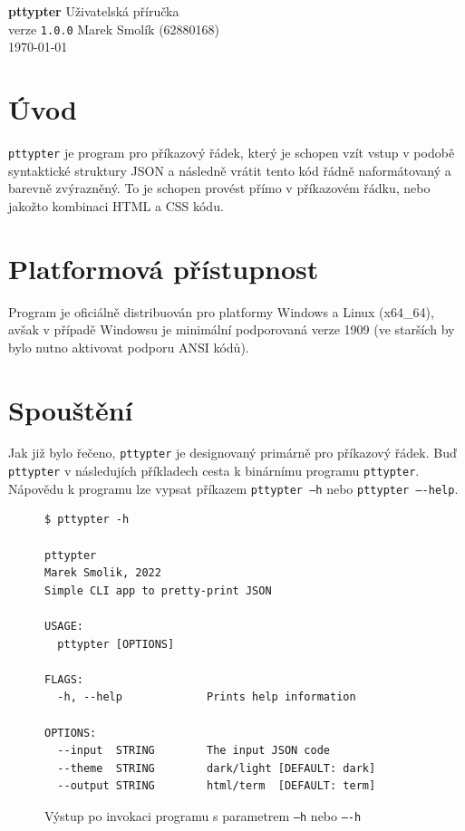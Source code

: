 \documentclass[11pt, letterpaper]{article}
\begin{document}
 
\begin{center}
\vfill
{\Huge \textbf{pttypter}}
\vfill
{\huge Uživatelská příručka} \\
{\large verze \texttt{1.0.0}}
\vfill
{\Large Marek Smolík (62880168)} \\
\today
\vfill
\end{center}

\newpage

\section{Úvod}
\texttt{pttypter} je program pro příkazový řádek, který je schopen vzít vstup v podobě syntaktické struktury JSON a následně vrátit tento kód řádně naformátovaný a barevně zvýrazněný. To je schopen provést přímo v příkazovém řádku, nebo jakožto kombinaci HTML a CSS kódu.

\section{Platformová přístupnost}
Program je oficiálně distribuován pro platformy Windows a Linux (x64\_64), avšak v případě Windowsu je minimální podporovaná verze 1909 (ve starších by bylo nutno aktivovat podporu ANSI kódů).

\section{Spouštění}
Jak již bylo řečeno, \texttt{pttypter} je designovaný primárně pro příkazový řádek. Buď \texttt{pttypter} v následujích příkladech cesta k binárnímu programu \texttt{pttypter}. Nápovědu k programu lze vypsat příkazem \texttt{pttypter --h} nebo \texttt{pttypter ----help}.


\begin{figure}[h]
    \begin{center}
        \begin{lstlisting}
$ pttypter -h

pttypter
Marek Smolik, 2022
Simple CLI app to pretty-print JSON

USAGE:
  pttypter [OPTIONS]

FLAGS:
  -h, --help             Prints help information

OPTIONS:
  --input  STRING        The input JSON code
  --theme  STRING        dark/light [DEFAULT: dark]
  --output STRING        html/term  [DEFAULT: term]
        \end{lstlisting}
    \end{center}
    \caption{Výstup po invokaci programu s parametrem \texttt{--h} nebo \texttt{----h}}
\end{figure}
\end{document}
